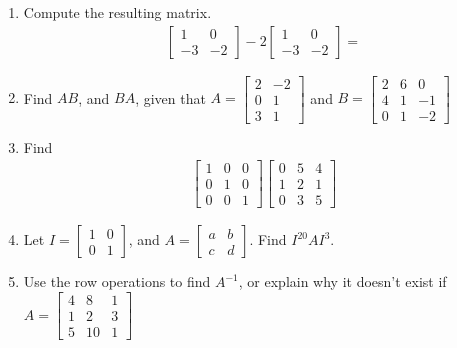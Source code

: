 \documentclass[12pt]{article}
\begin{document}
\begin{enumerate}
\item Compute the resulting matrix.
\begin{align*}
\begin{bmatrix}
1 & 0 \\
-3 & -2
\end{bmatrix} -2
\begin{bmatrix}
1 & 0 \\
-3 & -2
\end{bmatrix} =
\end{align*}
\vspace{3.0cm}

\item Find $AB$, and $BA$, given that $A=\begin{bmatrix}
2 & -2 \\
0 & 1 \\
3 & 1
\end{bmatrix}$ and $B=\begin{bmatrix}
2 & 6 & 0 \\
4 & 1 & -1 \\
0 & 1 & -2
\end{bmatrix}$
\vspace{5.0cm}

\item Find
\begin{align*}
	\begin{bmatrix}
		1 & 0 & 0 \\
		0 & 1 & 0 \\
		0 & 0 & 1
	\end{bmatrix}
	\begin{bmatrix}
		0 & 5 & 4 \\
		1 & 2 & 1 \\
		0 & 3 & 5
	\end{bmatrix}
\end{align*}
\vspace{3.0cm}

\item Let $I=\begin{bmatrix} 1 & 0 \\ 0 & 1 \end{bmatrix}$, and $A=\begin{bmatrix} a & b \\ c & d \end{bmatrix}$.  Find $I^{20}AI^{3}$.
\vspace{3.5cm}

\item Use the row operations to find $A^{-1}$, or explain why it doesn't exist if \\$A= \begin{bmatrix} 4 & 8 & 1 \\ 1 & 2 & 3 \\ 5 & 10 & 1 \end{bmatrix}$
\vspace{3.5cm}


\end{enumerate}
\end{document}
